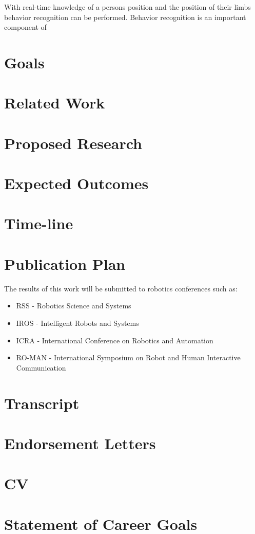 \documentclass[12pt,a4paper]{article}
\begin{document}
With real-time knowledge of a persons position and the position of their limbs behavior recognition can be performed\cite{journals/ijsr/MeadAM13}. Behavior recognition is an important component of 
\section{Goals}
\section{Related Work}
\section{Proposed Research}
\section{Expected Outcomes}
\section{Time-line}



\newpage
\section{Publication Plan}
The results of this work will be submitted to robotics conferences such as:
\begin{itemize}
 \item RSS - Robotics Science and Systems
 \item IROS - Intelligent Robots and Systems
 \item ICRA - International Conference on Robotics and Automation
 \item RO-MAN - International Symposium on Robot and Human Interactive Communication
\end{itemize}

\section{Transcript}
\section{Endorsement Letters}
\section{CV}
\section{Statement of Career Goals}
\end{document}
